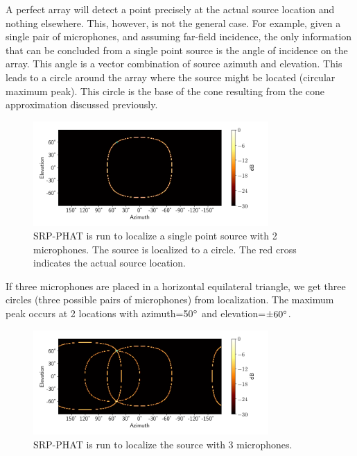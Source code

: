 A perfect array will detect a point precisely at the actual source location and nothing elsewhere. This, however, is not the general case. For example, given a single pair of microphones, and assuming far-field incidence, the only information that can be concluded from a single point source is the angle of incidence on the array. This angle is a vector combination of source azimuth and elevation. This leads to a circle around the array where the source might be located (circular maximum peak). This circle is the base of the cone resulting from the cone approximation discussed previously.
\begin{figure}[H]
    \centering
    \includegraphics[width=0.8\textwidth]{Figures/2mic1srcRes.png}
    \caption{SRP-PHAT is run to localize a single point source with 2 microphones. The source is localized to a circle. The red cross indicates the actual source location.}
    \label{fig:2mic1src}
\end{figure}
If three microphones are placed in a horizontal equilateral triangle, we get three circles (three possible pairs of microphones) from localization. The maximum peak occurs at 2 locations with azimuth=50$\degree$ and elevation=$\pm 60\degree$.
\begin{figure}[H]
    \centering
    \includegraphics[width=0.8\textwidth]{Figures/3mic1srcRes.png}
    \caption{SRP-PHAT is run to localize the source with 3 microphones.}
    \label{fig:3mic1src}
\end{figure}
